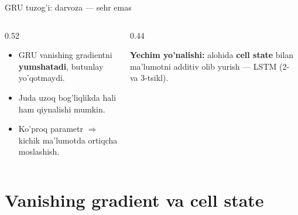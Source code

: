 \documentclass[aspectratio=169,11pt]{beamer}
\begin{document}
\begin{frame}{GRU tuzog'i: darvoza --- sehr emas}
  \begin{columns}[T]
    \begin{column}{0.52\textwidth}
      \begin{tcolorbox}[warnbox,title=Cheklovlar]
        \small
        \begin{itemize}\setlength\itemsep{2pt}
          \item GRU vanishing gradientni \textbf{yumshatadi}, butunlay yo'qotmaydi.
          \item Juda uzoq bog'liqlikda hali ham qiynalishi mumkin.
          \item Ko'proq parametr $\Rightarrow$ kichik ma'lumotda ortiqcha moslashish.
        \end{itemize}
      \end{tcolorbox}
    \end{column}
    \begin{column}{0.44\textwidth}
      \begin{tcolorbox}[okbox,top=2pt,bottom=2pt]
        \footnotesize
        \textbf{Yechim yo'nalishi:} alohida \textbf{cell state} bilan ma'lumotni
        additiv olib yurish --- LSTM (2- va 3-tsikl).
      \end{tcolorbox}
    \end{column}
  \end{columns}
\end{frame}

\section[Cell state]{Vanishing gradient va cell state}
\end{document}

